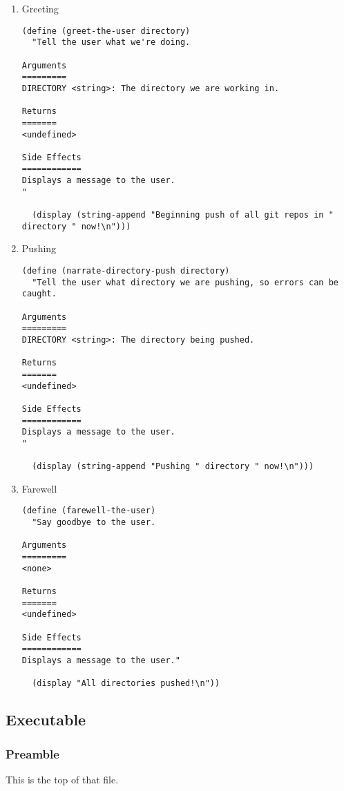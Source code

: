 \documentclass[11pt]{article}
\begin{document}
\begin{enumerate}
\item Greeting
\label{sec:orgd0fbf2b}

\begin{verbatim}
(define (greet-the-user directory)
  "Tell the user what we're doing.

Arguments
=========
DIRECTORY <string>: The directory we are working in.

Returns
=======
<undefined>

Side Effects
============
Displays a message to the user.
"

  (display (string-append "Beginning push of all git repos in " directory " now!\n")))
\end{verbatim}

\item Pushing
\label{sec:orgd690aeb}
\begin{verbatim}
(define (narrate-directory-push directory)
  "Tell the user what directory we are pushing, so errors can be caught.

Arguments
=========
DIRECTORY <string>: The directory being pushed.

Returns
=======
<undefined>

Side Effects
============
Displays a message to the user.
"

  (display (string-append "Pushing " directory " now!\n")))
\end{verbatim}

\item Farewell
\label{sec:org537e4a6}
\begin{verbatim}
(define (farewell-the-user)
  "Say goodbye to the user.

Arguments
=========
<none>

Returns
=======
<undefined>

Side Effects
============
Displays a message to the user."

  (display "All directories pushed!\n"))
\end{verbatim}
\end{enumerate}

\subsection{Executable}
\label{sec:orgbb69a66}
\subsubsection{Preamble}
\label{sec:org6457814}
This is the top of that file.
\end{document}
